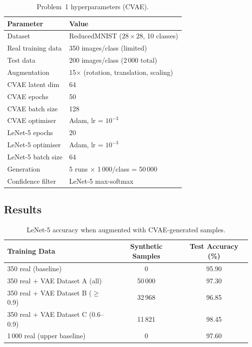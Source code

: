 \documentclass[12pt, a4paper]{article}
\renewcommand{\arraystretch}{1.12}
\begin{document}
\begin{table}[H]
\centering
\renewcommand{\arraystretch}{1.3}
\begin{tabular}{l l}
\toprule
\textbf{Parameter} & \textbf{Value} \\
\midrule
Dataset            & ReducedMNIST ($28 \times 28$, 10 classes) \\
Real training data & 350 images/class (limited) \\
Test data          & 200 images/class (2\,000 total) \\
Augmentation       & 15$\times$ (rotation, translation, scaling) \\
\midrule
CVAE latent dim    & 64 \\
CVAE epochs        & 50 \\
CVAE batch size    & 128 \\
CVAE optimiser     & Adam, lr = $10^{-3}$ \\
\midrule
LeNet-5 epochs     & 20 \\
LeNet-5 optimiser  & Adam, lr = $10^{-3}$ \\
LeNet-5 batch size & 64 \\
\midrule
Generation         & 5 runs $\times$ 1\,000/class = 50\,000 \\
Confidence filter  & LeNet-5 max-softmax \\
\bottomrule
\end{tabular}
\caption{Problem~1 hyperparameters (CVAE).}
\label{tab:p1_hyperparams}
\end{table}

\subsection{Results}

\begin{table}[H]
\centering
\renewcommand{\arraystretch}{1.3}
\begin{tabular}{l c c}
\toprule
\textbf{Training Data} & \textbf{Synthetic Samples} & \textbf{Test Accuracy (\%)} \\
\midrule
350 real (baseline)               & 0       & 95.90 \\
350 real + VAE Dataset A (all)    & 50\,000 & 97.30 \\
350 real + VAE Dataset B ($\geq$0.9)  & 32\,968   & 96.85 \\
350 real + VAE Dataset C (0.6--0.9)   & 11\,821   & 98.45 \\
\midrule
1\,000 real (upper baseline)      & 0       & 97.60 \\
\bottomrule
\end{tabular}
\caption{LeNet-5 accuracy when augmented with CVAE-generated samples.}
\label{tab:vae_results}
\end{table}
\end{document}
